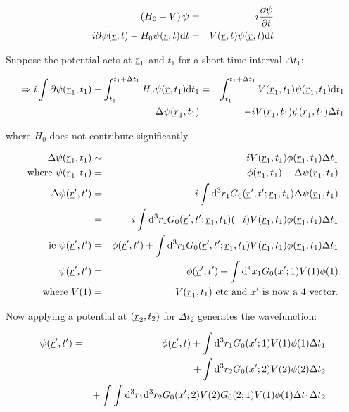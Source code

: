 \begin{eqnarray*}
  \left(H_0 + V\right)\psi & = & i\frac{\partial \psi}{\partial t} \\
  i\partial\psi(\underline{r},t) - H_0\psi(\underline{r},t)\mathrm{d}t & = & V(\underline{r},t)\psi(\underline{r},t)\mathrm{d}t
\end{eqnarray*}

Suppose the potential acts at $\underline{r}_1$ and $t_1$ for a short time interval $\Delta t_1$:

\begin{eqnarray*}
  \Rightarrow i\int\partial\psi(\underline{r}_1,t_1) - \int_{t_1}^{t_1+\Delta t_1}H_0\psi(\underline{r},t_1)\mathrm{d}t_1 & = & \int_{t_1}^{t_1+\Delta t_1} V(\underline{r}_1,t_1)\psi(\underline{r}_1,t_1)\mathrm{d}t_1 \\
  \Delta\psi(\underline{r}_1,t_1) & = & -iV(\underline{r}_1,t_1)\psi(\underline{r}_1,t_1)\Delta t_1
\end{eqnarray*}

where $H_0$ does not contribute significantly.

\begin{eqnarray*}
  \Delta \psi(\underline{r}_1,t_1) & \sim & -iV(\underline{r}_1,t_1)\phi(\underline{r}_1,t_1)\Delta t_1 \\
  \textrm{where } \psi(\underline{r}_1,t_1) & = & \phi(\underline{r}_1,t_1) + \Delta \psi(\underline{r}_1,t_1) \\
  \Delta\psi(\underline{r}',t') & = & i \int \mathrm{d}^3r_1 G_0(\underline{r}',t';\underline{r}_1,t_1)\Delta\psi(\underline{r}_1,t_1) \\
  & = & i\int\mathrm{d}^3r_1 G_0(\underline{r}',t';\underline{r}_1,t_1)(-i)V(\underline{r}_1,t_1)\phi(\underline{r}_1,t_1)\Delta t_1 \\
  \textrm{ie } \psi(\underline{r}',t') & = & \phi(\underline{r}',t') + \int\mathrm{d}^3r_1 G_0(\underline{r}',t';\underline{r}_1,t_1)V(\underline{r}_1,t_1)\phi(\underline{r}_1,t_1)\Delta t_1 \\
  \psi(\underline{r}',t') & = & \phi(\underline{r}',t') + \int \mathrm{d}^4x_1 G_0(x';1)V(1)\phi(1) \\
  \textrm{where }V(1) & = & V(\underline{r}_1,t_1) \textrm{ etc and } x' \textrm{ is now a 4 vector.}
\end{eqnarray*}

Now applying a potential at $(\underline{r}_2,t_2)$ for $\Delta t_2$ generates the wavefunction:

\begin{eqnarray*}
  \psi(\underline{r}',t') & = & \phi(\underline{r}',t) + \int \mathrm{d}^3r_1G_0(x';1)V(1)\phi(1)\Delta t_1 \\
                          &   & + \int \mathrm{d}^3r_2 G_0(x';2)V(2)\phi(2)\Delta t_2 \\
                          &   & + \int\int \mathrm{d}^3r_1 \mathrm{d}^3r_2 G_0(x';2)V(2)G_0(2;1)V(1)\phi(1)\Delta t_1 \Delta t_2
\end{eqnarray*}

